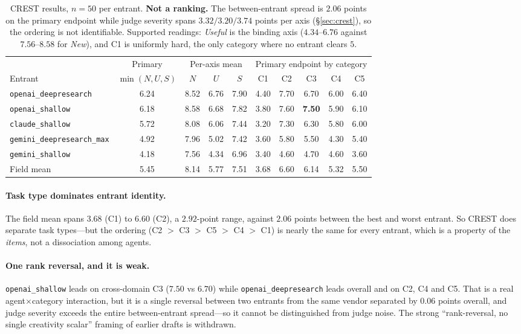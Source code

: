 \begin{table}[t]
\centering
\small
\begin{tabular}{lccccccccc}
\toprule
 & \multicolumn{1}{c}{Primary} & \multicolumn{3}{c}{Per-axis mean} & \multicolumn{5}{c}{Primary endpoint by category} \\
\cmidrule(lr){2-2}\cmidrule(lr){3-5}\cmidrule(lr){6-10}
Entrant & $\min(N,U,S)$ & $N$ & $U$ & $S$ & C1 & C2 & C3 & C4 & C5 \\
\midrule
\texttt{openai\_deepresearch}     & 6.24 & 8.52 & 6.76 & 7.90 & 4.40 & 7.70 & 6.70 & 6.00 & 6.40 \\
\texttt{openai\_shallow}          & 6.18 & 8.58 & 6.68 & 7.82 & 3.80 & 7.60 & \textbf{7.50} & 5.90 & 6.10 \\
\texttt{claude\_shallow}          & 5.72 & 8.08 & 6.06 & 7.44 & 3.20 & 7.30 & 6.30 & 5.80 & 6.00 \\
\texttt{gemini\_deepresearch\_max}& 4.92 & 7.96 & 5.02 & 7.42 & 3.60 & 5.80 & 5.50 & 4.30 & 5.40 \\
\texttt{gemini\_shallow}          & 4.18 & 7.56 & 4.34 & 6.96 & 3.40 & 4.60 & 4.70 & 4.60 & 3.60 \\
\midrule
Field mean                        & 5.45 & 8.14 & 5.77 & 7.51 & 3.68 & 6.60 & 6.14 & 5.32 & 5.50 \\
\bottomrule
\end{tabular}
\caption{CREST results, $n=50$ per entrant. \textbf{Not a ranking.} The between-entrant spread is
$2.06$ points on the primary endpoint while judge severity spans $3.32/3.20/3.74$ points per axis
(\S\ref{sec:crest}), so the ordering is not identifiable. Supported readings: \emph{Useful} is the
binding axis ($4.34$--$6.76$ against $7.56$--$8.58$ for \emph{New}), and C1 is uniformly hard, the
only category where no entrant clears $5$.}
\label{tab:results}
\end{table}

\paragraph{Task type dominates entrant identity.} The field mean spans $3.68$ (C1) to $6.60$ (C2), a
$2.92$-point range, against $2.06$ points between the best and worst entrant. So CREST does separate
task types---but the ordering (C2 $>$ C3 $>$ C5 $>$ C4 $>$ C1) is nearly the same for every entrant,
which is a property of the \emph{items}, not a dissociation among agents.

\paragraph{One rank reversal, and it is weak.} \texttt{openai\_shallow} leads on cross-domain C3
($7.50$ vs $6.70$) while \texttt{openai\_deepresearch} leads overall and on C2, C4 and C5. That is a
real agent$\times$category interaction, but it is a single reversal between two entrants from the
same vendor separated by $0.06$ points overall, and judge severity exceeds the entire
between-entrant spread---so it cannot be distinguished from judge noise. The strong
``rank-reversal, no single creativity scalar'' framing of earlier drafts is withdrawn.


